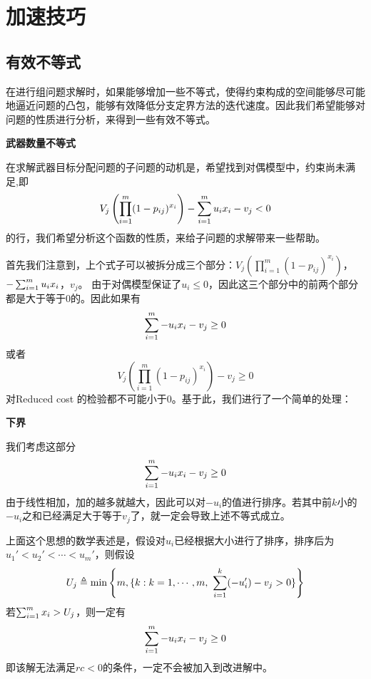 \section{加速技巧}
\subsection{有效不等式}
在进行组问题求解时，如果能够增加一些不等式，使得约束构成的空间能够尽可能地逼近问题的凸包，能够有效降低分支定界方法的迭代速度。因此我们希望能够对问题的性质进行分析，来得到一些有效不等式。

\textbf{武器数量不等式}

在求解武器目标分配问题的子问题的动机是，希望找到对偶模型中，约束尚未满足,即
\begin{equation*}
    V_j \left( \prod_{i=1}^m (1 - p_{ij}) ^ {x_{i}}  \right) - \sum_{i=1}^{m} u_i x_i - v_j < 0
\end{equation*}
的行，我们希望分析这个函数的性质，来给子问题的求解带来一些帮助。

首先我们注意到，上个式子可以被拆分成三个部分：$V_j \left( \prod_{i=1}^m (1 - p_{ij}) ^ {x_{i}}  \right)$，$- \sum_{i=1}^{m} u_i x_i$，$v_j$。
由于对偶模型保证了$u_i \leq 0$，因此这三个部分中的前两个部分都是大于等于0的。因此如果有
\begin{equation*}
    \sum_{i=1}^{m} -u_i x_i - v_j \geq 0
\end{equation*}
或者
\begin{equation*}
    V_j \left( \prod_{i=1}^m (1 - p_{ij}) ^ {x_{i}}  \right) - v_j \geq 0
\end{equation*}
对Reduced cost 的检验都不可能小于0。基于此，我们进行了一个简单的处理：

\textbf{下界}

我们考虑这部分
\begin{equation*}
    \sum_{i=1}^{m} -u_i x_i - v_j \geq 0
\end{equation*}
由于线性相加，加的越多就越大，因此可以对$-u_i$的值进行排序。若其中前$k$小的$-u_i$之和已经满足大于等于$v_j$了，就一定会导致上述不等式成立。

上面这个思想的数学表述是，假设对$u_i$已经根据大小进行了排序，排序后为$u_1' < u_2' < \cdots < u_m'$，则假设
\begin{equation*}
    U_j \triangleq \min \left\{ m, \{k:k = 1, \cdots, m,\ \sum_{i=1}^{k} (-u_i') - v_j > 0 \}\right\}
\end{equation*}
若$\sum_{i=1}^{m} x_i > U_j$，则一定有
\begin{equation*}
    \sum_{i=1}^{m} -u_i x_i - v_j \geq 0
\end{equation*}
即该解无法满足$rc < 0$的条件，一定不会被加入到改进解中。


